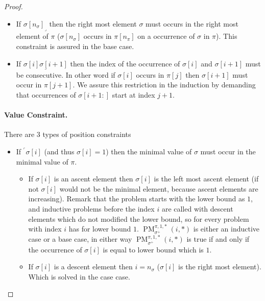 \documentclass[a4paper]{llncs}
\newcommand{\ptext}{\pi}
\newcommand{\pmotif}{\sigma}
\newcommand{\pbmotif}{\pmotif^+}
\DeclareMathOperator{\PMa}{PM}
\newcommand{\PM}[6]{\PMa_{{#1}}^{{#2},{#3},{#4}}({#5},{#6})}
\begin{document}
\begin{proof}
\begin{itemize}
	\item If ${\pmotif[n_\pmotif]}_\lrcorner$ then the right most element $\sigma$ must occurs in the right most element of $\pi$ ($\pmotif[n_\pmotif]$ occurs in $\ptext[n_\ptext]$ on a occurrence of $\pmotif$ in $\ptext$). This constraint is assured in the base case.
	
	\item If $\underline{\pmotif[i]\pmotif[i+1]}$ then the index of the occurrence of $\pmotif[i]$ and $\pmotif[i+1]$ must be consecutive. In other word if $\pmotif[i]$ occurs in $\ptext[j]$ then $\pmotif[i+1]$ must occur in $\ptext[j+1]$. We assure this restriction in the induction by demanding that occurrences of $\pmotif[i+1:]$  start at index $j+1$. 
\end{itemize}

\paragraph{Value Constraint.} There are 3 types of position constraints 
\begin{itemize}
	\item If $^\ulcorner{\sigma[i]}$ (and thus $\sigma[i]=1$) then the minimal value of $\pmotif$ must occur in the minimal value of $\ptext$. 
	\begin{itemize}
		\item If $\sigma[i]$ is an ascent element then $\sigma[i]$ is the left most ascent element (if not $\sigma[i]$ would not be the minimal element, because ascent elements are increasing). Remark that the problem starts with the lower bound as $1$, and inductive problems before the index $i$ are called with descent elements which do not modified the lower bound, so for every problem with index $i$ has for lower bound $1$. 
		$\PM{\pbmotif}{\ptext}{1}{*}{i}{*}$ is either an inductive case or a base case, in either way  $\PM{\pbmotif}{\ptext}{1}{*}{i}{*}$ is true if and only if the occurrence of $\sigma[i]$ is equal to lower bound which is  $1$.	
				
		\item If $\sigma[i]$ is a descent element then $i=n_\pmotif$ ($\sigma[i]$ is the right most element). Which is solved in the case case.
	\end{itemize}
	
	
	

\end{itemize}
\end{proof}
\end{document}
